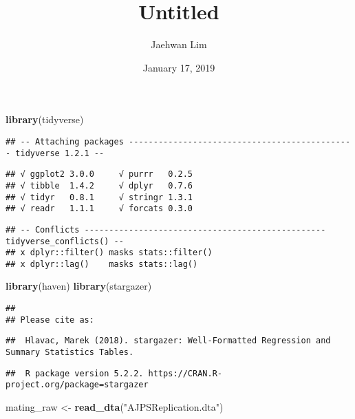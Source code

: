 \documentclass[]{article}
\title{Untitled}
\author{Jaehwan Lim}
\date{January 17, 2019}
\newenvironment{Shaded}{\begin{snugshade}}{\end{snugshade}}
\newcommand{\KeywordTok}[1]{\textcolor[rgb]{0.13,0.29,0.53}{\textbf{#1}}}
\newcommand{\StringTok}[1]{\textcolor[rgb]{0.31,0.60,0.02}{#1}}
\newcommand{\NormalTok}[1]{#1}
\begin{document}
\maketitle

\begin{Shaded}
\begin{Highlighting}[]
\KeywordTok{library}\NormalTok{(tidyverse)}
\end{Highlighting}
\end{Shaded}

\begin{verbatim}
## -- Attaching packages ---------------------------------------------- tidyverse 1.2.1 --
\end{verbatim}

\begin{verbatim}
## √ ggplot2 3.0.0     √ purrr   0.2.5
## √ tibble  1.4.2     √ dplyr   0.7.6
## √ tidyr   0.8.1     √ stringr 1.3.1
## √ readr   1.1.1     √ forcats 0.3.0
\end{verbatim}

\begin{verbatim}
## -- Conflicts ------------------------------------------------- tidyverse_conflicts() --
## x dplyr::filter() masks stats::filter()
## x dplyr::lag()    masks stats::lag()
\end{verbatim}

\begin{Shaded}
\begin{Highlighting}[]
\KeywordTok{library}\NormalTok{(haven)}
\KeywordTok{library}\NormalTok{(stargazer)}
\end{Highlighting}
\end{Shaded}

\begin{verbatim}
## 
## Please cite as:
\end{verbatim}

\begin{verbatim}
##  Hlavac, Marek (2018). stargazer: Well-Formatted Regression and Summary Statistics Tables.
\end{verbatim}

\begin{verbatim}
##  R package version 5.2.2. https://CRAN.R-project.org/package=stargazer
\end{verbatim}

\begin{Shaded}
\begin{Highlighting}[]
\NormalTok{mating_raw <-}\StringTok{ }\KeywordTok{read_dta}\NormalTok{(}\StringTok{"AJPSReplication.dta"}\NormalTok{)}
\end{Highlighting}
\end{Shaded}
\end{document}
